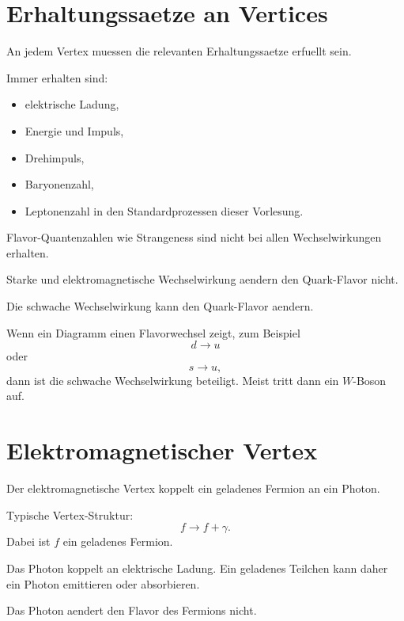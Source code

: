 \section{Erhaltungssaetze an Vertices}

An jedem Vertex muessen die relevanten Erhaltungssaetze erfuellt sein.

\begin{notebox}
Immer erhalten sind:
\begin{itemize}
    \item elektrische Ladung,
    \item Energie und Impuls,
    \item Drehimpuls,
    \item Baryonenzahl,
    \item Leptonenzahl in den Standardprozessen dieser Vorlesung.
\end{itemize}
\end{notebox}

\begin{conceptbox}
Flavor-Quantenzahlen wie Strangeness sind nicht bei allen Wechselwirkungen erhalten.

Starke und elektromagnetische Wechselwirkung aendern den Quark-Flavor nicht.

Die schwache Wechselwirkung kann den Quark-Flavor aendern.
\end{conceptbox}

\begin{examtipbox}
Wenn ein Diagramm einen Flavorwechsel zeigt, zum Beispiel
\[
    d \rightarrow u
\]
oder
\[
    s \rightarrow u,
\]
dann ist die schwache Wechselwirkung beteiligt.
Meist tritt dann ein $W$-Boson auf.
\end{examtipbox}

\section{Elektromagnetischer Vertex}

Der elektromagnetische Vertex koppelt ein geladenes Fermion an ein Photon.

\begin{formulabox}
Typische Vertex-Struktur:
\[
    f \rightarrow f + \gamma.
\]
Dabei ist $f$ ein geladenes Fermion.
\end{formulabox}

\begin{conceptbox}
Das Photon koppelt an elektrische Ladung.
Ein geladenes Teilchen kann daher ein Photon emittieren oder absorbieren.

Das Photon aendert den Flavor des Fermions nicht.
\end{conceptbox}


